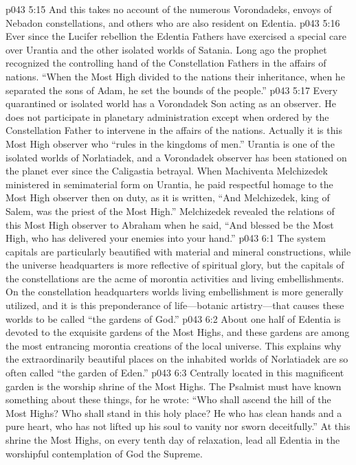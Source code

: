 \vs p043 5:15 And this takes no account of the numerous Vorondadeks, envoys of Nebadon constellations, and others who are also resident on Edentia.
\pc \vs p043 5:16 Ever since the Lucifer rebellion the Edentia Fathers have exercised a special care over Urantia and the other isolated worlds of Satania. Long ago the prophet recognized the controlling hand of the Constellation Fathers in the affairs of nations. “When the Most High divided to the nations their inheritance, when he separated the sons of Adam, he set the bounds of the people.”
\vs p043 5:17 Every quarantined or isolated world has a Vorondadek Son acting as an observer. He does not participate in planetary administration except when ordered by the Constellation Father to intervene in the affairs of the nations. Actually it is this Most High observer who “rules in the kingdoms of men.” Urantia is one of the isolated worlds of Norlatiadek, and a Vorondadek observer has been stationed on the planet ever since the Caligastia betrayal. When Machiventa Melchizedek ministered in semimaterial form on Urantia, he paid respectful homage to the Most High observer then on duty, as it is written, “And Melchizedek, king of Salem, was the priest of the Most High.” Melchizedek revealed the relations of this Most High observer to Abraham when he said, “And blessed be the Most High, who has delivered your enemies into your hand.”
\vs p043 6:1 The system capitals are particularly beautified with material and mineral constructions, while the universe headquarters is more reflective of spiritual glory, but the capitals of the constellations are the acme of morontia activities and living embellishments. On the constellation headquarters worlds living embellishment is more generally utilized, and it is this preponderance of life---botanic artistry---that causes these worlds to be called “the gardens of God.”
\pc \vs p043 6:2 About one half of Edentia is devoted to the exquisite gardens of the Most Highs, and these gardens are among the most entrancing morontia creations of the local universe. This explains why the extraordinarily beautiful places on the inhabited worlds of Norlatiadek are so often called “the garden of Eden.”
\vs p043 6:3 Centrally located in this magnificent garden is the worship shrine of the Most Highs. The Psalmist must have known something about these things, for he wrote: “Who shall ascend the hill of the Most Highs? Who shall stand in this holy place? He who has clean hands and a pure heart, who has not lifted up his soul to vanity nor sworn deceitfully.” At this shrine the Most Highs, on every tenth day of relaxation, lead all Edentia in the worshipful contemplation of God the Supreme.
